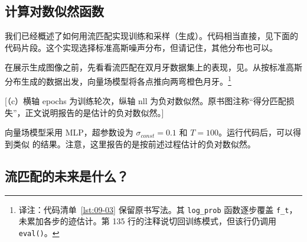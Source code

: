 \subsection{计算对数似然函数}

我们已经概述了如何用流匹配实现训练和采样（生成）。代码相当直接，见下面的代码片段。这个实现选择标准高斯噪声分布，但请记住，其他分布也可以。


在展示生成图像之前，先看看流匹配在双月牙数据集上的表现，见。从按标准高斯分布生成的数据出发，向量场模型将各点推向两弯橙色月牙。\footnote{译注：代码清单~\ref{lst:09-03} 保留原书写法。其 \texttt{log\_prob} 函数逐步覆盖 \texttt{f\_t}，未累加各步的迹估计。第 135 行的注释说切回训练模式，但该行仍调用 \texttt{eval()}。}


[（c）横轴 epochs 为训练轮次，纵轴 nll 为负对数似然。原书图注称“得分匹配损失”，正文说明报告的是估计的负对数似然。]

向量场模型采用 MLP，超参数设为 $\sigma_{\mathit{const}}=0.1$ 和 $T=100$。运行代码后，可以得到类似 的结果。注意，这里报告的是按前述过程估计的负对数似然。

\subsection{流匹配的未来是什么？}

